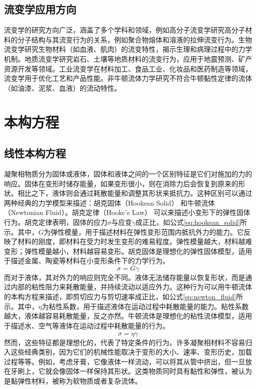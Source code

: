 \subsection{流变学应用方向}
流变学的研究方向广泛，涵盖了多个学科和领域，例如高分子流变学研究高分子材料的分子结构与其流变行为的关系，例如聚合物熔体和溶液的拉伸流变行为。生物流变学研究生物材料（如血液、肌肉）的流变特性，揭示生理和病理过程中的力学机制。地质流变学研究岩石、土壤等地质材料的流变行为，应用于地震预测、矿产资源开发等领域。工业流变学在材料加工、食品工业、化妆品和医药制造等领域，流变学用于优化工艺和产品性能。非牛顿流体力学研究不符合牛顿黏性定律的流体（如油漆、泥浆、血液）的流动特性。

\section{本构方程}
\subsection{线性本构方程}
凝聚相物质分为固体或液体，固体和液体之间的一个区别特征是它们对施加的力的响应。固体在变形时储存能量，如果变形很小，则在消除力后会恢复到原来的形状。相比之下，液体则会通过耗散能量和调整其形状来抵抗力\cite{ricarteTutorialReviewLinear2024}。这种区别可以通过两种经典的力学模型来描述：胡克固体（Hookean Solid） 和牛顿流体（Newtonian Fluid）。胡克定律（Hooke's Law） 可以来描述小变形下的弹性固体行为。胡克定律表明，固体的应力$\sigma$与应变$\gamma$成正比，如公式\eqref{eq:hookean_solid}所示。其中，$G$为弹性模量，用于描述材料在弹性变形范围内抵抗外力的能力。它反映了材料的刚度，即材料在受力时发生变形的难易程度。弹性模量越大，材料越难变形；弹性模量越小，材料越容易变形。胡克固体是理想化的弹性固体模型，适用于描述金属、陶瓷等材料在小变形条件下的力学行为。
\begin{equation}
	\sigma = G \gamma  \label{eq:hookean_solid}
\end{equation}
而对于液体，其对外力的响应则完全不同。液体无法储存能量以恢复形状，而是通过内部的粘性阻力来耗散能量，并持续流动以适应外力。这种行为可以用牛顿流体的本构方程来描述，即剪切应力与剪切速率成正比，如公式\eqref{eq:newton_fluid}所示。其中，$\eta$为粘性系数，用于描述液体在运动过程中耗散能量的能力。粘性系数越大，液体越容易耗散能量，反之亦然。牛顿流体是理想化的粘性流体模型，适用于描述水、空气等液体在运动过程中耗散能量的行为。
\begin{equation}
	\sigma = \eta \dot{\gamma}  \label{eq:newton_fluid}
\end{equation}
然而，这些特征都是理想化的，代表了特定条件的行为。许多凝聚相材料不容易归入这些经典类别，因为它们的机械性能取决于变形的大小、速率、变形历史，加载过程等等。例如，考虑牙膏，它像液体一样流动，可以将其从管中挤出，但一旦放在牙刷上，它就会像固体一样保持其形状。这类物质同时具有黏性和弹性，被认为是黏弹性材料，被称为软物质或者复杂流体。

